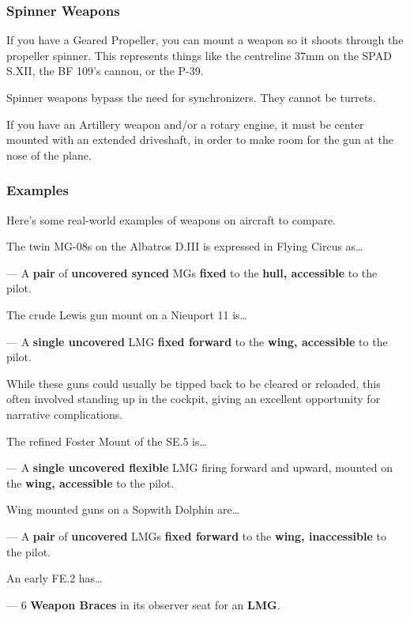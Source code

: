 \documentclass{article}
\begin{document}
\subsubsection{Spinner Weapons}
\label{_Spinner_Weapons}

If you have a Geared Propeller, you can mount a weapon so it shoots
through the propeller spinner. This represents things like the
centreline 37mm on the SPAD S.XII, the BF 109's cannon, or the P-39.

Spinner weapons bypass the need for synchronizers. They cannot be
turrets.

If you have an Artillery weapon and/or a rotary engine, it must be
center mounted with an extended driveshaft, in order to make room for
the gun at the nose of the plane.

\subsubsection{Examples}
\label{_Examples}

Here's some real-world examples of weapons on aircraft to compare.

The twin MG-08s on the Albatros D.III is expressed in Flying Circus
as\ldots{}

--- A \textbf{pair} of \textbf{uncovered
  synced} MGs \textbf{fixed} to the
\textbf{hull, accessible }to
the pilot.

The crude Lewis gun mount on a Nieuport 11 is\ldots{}

--- A \textbf{single uncovered} LMG \textbf{fixed forward} to the \textbf{wing, accessible} to
the pilot.

While these guns could usually be tipped back to be cleared or
reloaded, this often involved standing up in the cockpit, giving an
excellent opportunity for narrative complications.

The refined Foster Mount of the SE.5 is\ldots{}

--- A \textbf{single uncovered flexible} LMG firing forward and upward, mounted on the
\textbf{wing, accessible} to
the pilot.

Wing mounted guns on a Sopwith Dolphin are\ldots{}

--- A \textbf{pair }of
\textbf{uncovered} LMGs \textbf{fixed forward} to the \textbf{wing, inaccessible} to the pilot.

An early FE.2 has\ldots{}

--- 6 \textbf{Weapon Braces }in its observer seat for
an \textbf{LMG}.
\end{document}
